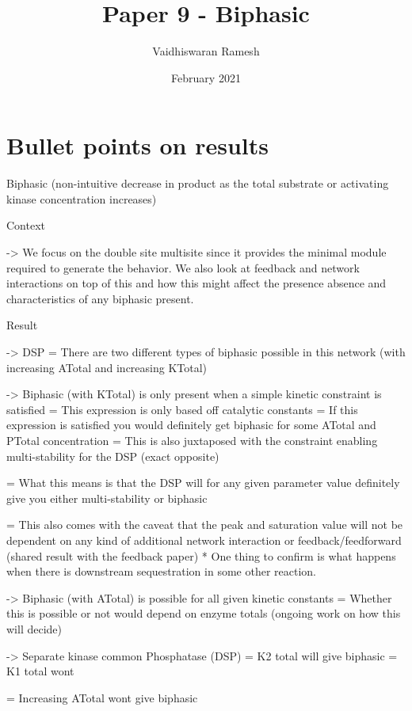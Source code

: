 \documentclass{article}
\title{Paper 9 - Biphasic}
\author{Vaidhiswaran Ramesh}
\date{February 2021}
\begin{document}
\maketitle

\section{Bullet points on results}

Biphasic (non-intuitive decrease in product as the total substrate or activating kinase concentration increases)

Context 

-> We focus on the double site multisite since it provides the minimal module required to generate the behavior. We also look at feedback and network interactions on top of this and how this might affect the presence absence and characteristics of any biphasic present.


Result 

-> DSP 
        = There are two different types of biphasic possible in this network (with increasing ATotal and increasing KTotal)

-> Biphasic (with KTotal) is only present when a simple kinetic constraint is satisfied 
        = This expression is only based off catalytic constants 
        = If this expression is satisfied you would definitely get biphasic for some ATotal and PTotal concentration
        = This is also juxtaposed with the constraint enabling multi-stability for the DSP (exact opposite)
        
        = What this means is that the DSP will for any given parameter value definitely give you either multi-stability or biphasic
        
        = This also comes with the caveat that the peak and saturation value will not be dependent on any kind of additional network interaction or feedback/feedforward (shared result with the feedback paper)
            * One thing to confirm is what happens when there is downstream sequestration in some other reaction. 
                
-> Biphasic (with ATotal) is possible for all given kinetic constants 
        = Whether this is possible or not would depend on enzyme totals (ongoing work on how this will decide)
        

-> Separate kinase common Phosphatase (DSP)
        = K2 total will give biphasic 
        = K1 total wont
        
        = Increasing ATotal wont give biphasic
\end{document}
